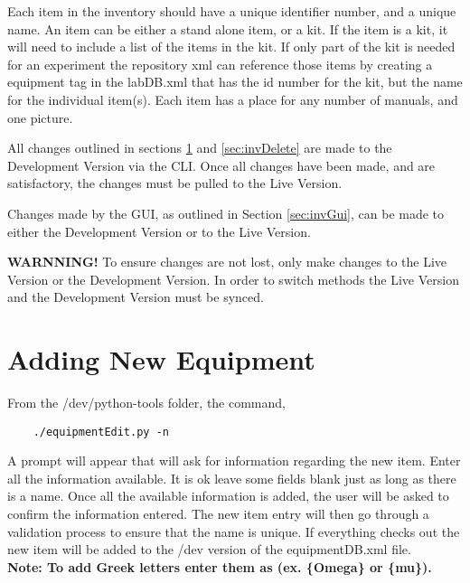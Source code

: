 \documentclass[justified]{LabArx3_5_1}
\begin{document}
Each item in the inventory should have a unique identifier number, and a unique name. An item can be either a stand alone item, or a kit. If the item is a kit, it will need to include a list of the items in the kit. If only part of the kit is needed for an experiment the repository xml can reference those items by creating a equipment tag in the labDB.xml that has the id number for the kit, but the name for the individual item(s). Each item has a place for any number of manuals, and one picture.

All changes outlined in sections \ref{sec:invNew} and \ref{sec:invDelete} are made to the Development Version via the CLI. Once all changes have been made, and are satisfactory, the changes must be pulled to the Live Version.

Changes made by the GUI, as outlined in Section \ref{sec:invGui}, can be made to either the Development Version or to the Live Version.

{\bf WARNNING!} To ensure changes are not lost, only make changes to the Live Version or the Development Version. In order to switch methods the Live Version and the Development Version must be synced. 


\section{Adding New Equipment}\label{sec:invNew}


From the /dev/python-tools folder, the command,

	\begin{lstlisting}
	./equipmentEdit.py -n       
	\end{lstlisting}

A prompt will appear that will ask for information regarding the new item. Enter all the information available. It is ok leave some fields blank just as long as there is a name. Once all the available information is added, the user will be asked to confirm the information entered. The new item entry will then go through a validation process to ensure that the name is unique. If everything checks out the new item will be added to the /dev version of the equipmentDB.xml file.\\

{\bf Note: To add Greek letters enter them as (ex. \{Omega\} or \{mu\}).}
\end{document}
